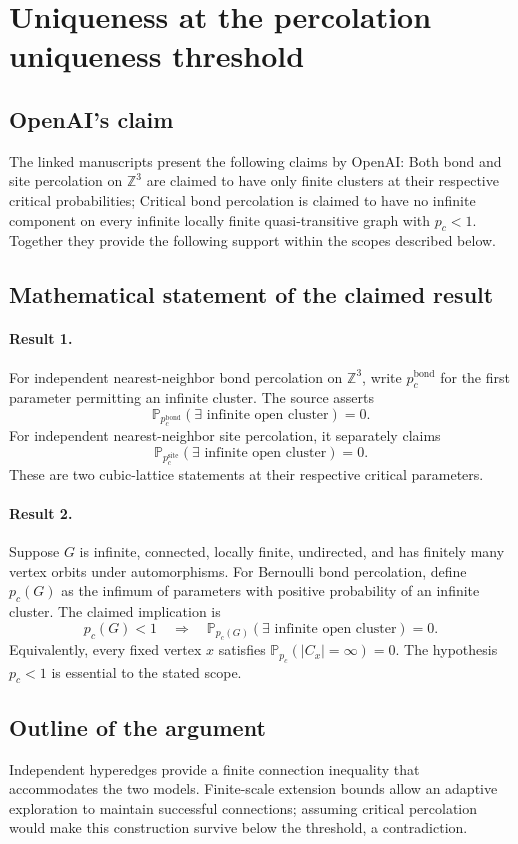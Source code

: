 \documentclass[11pt]{article}
\begin{document}
\section*{Uniqueness at the percolation uniqueness threshold}

\subsection{OpenAI's claim}
The linked manuscripts present the following claims by OpenAI: Both bond and site percolation on $\mathbb Z^3$ are claimed to have only finite clusters at their respective critical probabilities; Critical bond percolation is claimed to have no infinite component on every infinite locally finite quasi-transitive graph with $p_c<1$. Together they provide the following support within the scopes described below.

\subsection{Mathematical statement of the claimed result}
\paragraph{Result 1.} For independent nearest-neighbor bond percolation on \(\mathbb Z^3\), write \(p_c^{\mathrm{bond}}\) for the first parameter permitting an infinite cluster. The source asserts
\[
 \mathbb P_{p_c^{\mathrm{bond}}}(\exists\text{ infinite open cluster})=0.
\]
For independent nearest-neighbor site percolation, it separately claims
\[
 \mathbb P_{p_c^{\mathrm{site}}}(\exists\text{ infinite open cluster})=0.
\]
These are two cubic-lattice statements at their respective critical parameters.

\paragraph{Result 2.} Suppose \(G\) is infinite, connected, locally finite, undirected, and has finitely many vertex orbits under automorphisms. For Bernoulli bond percolation, define \(p_c(G)\) as the infimum of parameters with positive probability of an infinite cluster. The claimed implication is
\[
 p_c(G)<1\quad\Longrightarrow\quad
 \mathbb P_{p_c(G)}(\exists\text{ infinite open cluster})=0.
\]
Equivalently, every fixed vertex \(x\) satisfies \(\mathbb P_{p_c}(|C_x|=\infty)=0\). The hypothesis \(p_c<1\) is essential to the stated scope.

\subsection{Outline of the argument}
Independent hyperedges provide a finite connection inequality that accommodates the two models. Finite-scale extension bounds allow an adaptive exploration to maintain successful connections; assuming critical percolation would make this construction survive below the threshold, a contradiction.
\end{document}
